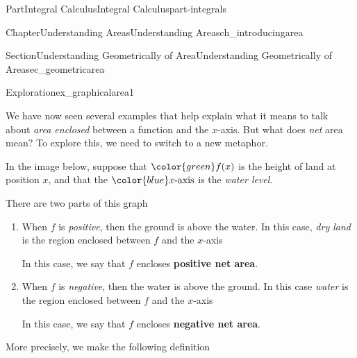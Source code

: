 \documentclass{tufte-book}
\newcommand{\terminology}[1]{\textbf{#1}}
\numberwithin{equation}{chapter}
\newcommand{\blue}[1]{  {\color{blue}  #1}  }
\newcommand{\green}[1]{ {\color{green} #1} }
\begin{document}
\begin{partptx}{Part}{Integral Calculus}{}{Integral Calculus}{}{}{part-integrals}
\begin{chapterptx}{Chapter}{Understanding Areas}{}{Understanding Areas}{}{}{ch_introducingarea}
\begin{sectionptx}{Section}{Understanding Geometrically of Area}{}{Understanding Geometrically of Area}{}{}{sec_geometricarea}
\begin{exploration}{Exploration}{}{ex_graphicalarea1}
\begin{enumerate}[font=\bfseries,label=(\alph*),ref=\alph*]
\begin{image}{0.25}{0.5}{0.25}{}
{
}%
\end{image}%
\end{enumerate}%
\end{exploration}%
We have now seen several examples that help explain what it means to talk about \emph{area enclosed} between a function and the \(x\)-axis. But what does \emph{net} area mean? To explore this, we need to switch to a new metaphor.%
\par
In the image below, suppose that \(\green{f(x)}\) is the height of land at position \(x\), and that the \(\blue{x\text{-axis}}\) is the \emph{water level}.%
\begin{image}{0.125}{0.75}{0.125}{}%
%
\end{image}%
There are two parts of this graph%
\begin{enumerate}
\item{}When \(f\) is \emph{positive}, then the ground is above the water.  In this case, \emph{dry land} is the region enclosed between \(f\) and the \(x\)-axis%
\par
In this case, we say that \(f\) encloses \terminology{positive net area}.%
\item{}When \(f\) is \emph{negative}, then the water is above the ground.  In this case \emph{water} is the region enclosed between \(f\) and the \(x\)-axis%
\par
In this case, we say that \(f\) encloses \terminology{negative net area}.%
\end{enumerate}
More precisely, we make the following definition%

\end{sectionptx}
\end{chapterptx}
\end{partptx}
\end{document}
